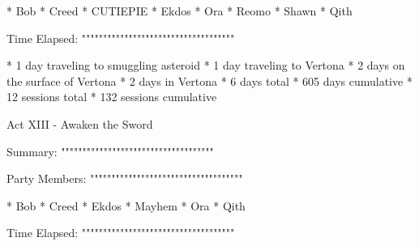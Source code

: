   * Bob
  * Creed
  * CUTIEPIE
  * Ekdos
  * Ora
  * Reomo
  * Shawn
  * Qith

Time Elapsed:
""""""""""""""""""""""""""""""""""""

  * 1 day traveling to smuggling asteroid
  * 1 day traveling to Vertona
  * 2 days on the surface of Vertona
  * 2 days in Vertona
  * 6 days total
  * 605 days cumulative
  * 12 sessions total
  * 132 sessions cumulative

Act XIII - Awaken the Sword
^^^^^^^^^^^^^^^^^^^^^^^^^^^^^^^^^^^^

Summary:
""""""""""""""""""""""""""""""""""""



Party Members:
""""""""""""""""""""""""""""""""""""

  * Bob
  * Creed
  * Ekdos
  * Mayhem
  * Ora
  * Qith

Time Elapsed:
""""""""""""""""""""""""""""""""""""

